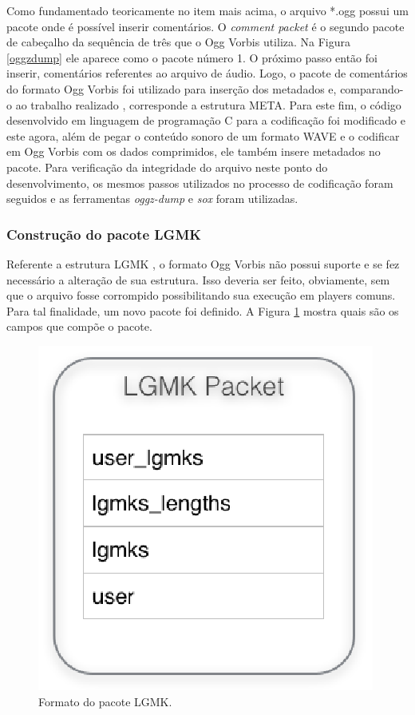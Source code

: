 Como fundamentado teoricamente no item mais acima, o arquivo *.ogg possui um pacote onde é possível inserir comentários. O \textit{comment packet} é o segundo pacote de cabeçalho da sequência de três que o Ogg Vorbis utiliza. Na Figura \ref{oggzdump} ele aparece como o pacote número 1. O próximo passo então foi inserir, comentários referentes ao arquivo de áudio. Logo, o pacote de comentários do formato Ogg Vorbis foi utilizado para inserção dos metadados e, comparando-o ao trabalho realizado \cite{herbert}, corresponde a estrutura META. Para este fim, o código desenvolvido em linguagem de programação C para a codificação foi modificado e este agora, além de pegar o conteúdo sonoro de um formato WAVE e o codificar em Ogg Vorbis com os dados comprimidos, ele também insere metadados no pacote. Para verificação da integridade do arquivo neste ponto do desenvolvimento, os mesmos passos utilizados no processo de codificação foram seguidos e as ferramentas \textit{oggz-dump} e \textit{sox} foram utilizadas.

\subsubsection{Construção do pacote LGMK}

Referente a estrutura LGMK \cite{herbert}, o formato Ogg Vorbis não possui suporte e se fez necessário a alteração de sua estrutura. Isso deveria ser feito, obviamente, sem que o arquivo fosse corrompido possibilitando sua execução em players comuns. Para tal finalidade, um novo pacote foi definido. A Figura \ref{lgmk} mostra quais são os campos que compõe o pacote.

 \begin{figure}[ht]
	\centering
		\includegraphics[keepaspectratio=true,scale=0.8]{figuras/lgmks.eps}
	\caption{Formato do pacote LGMK.}
	\label{lgmk}
\end{figure}

